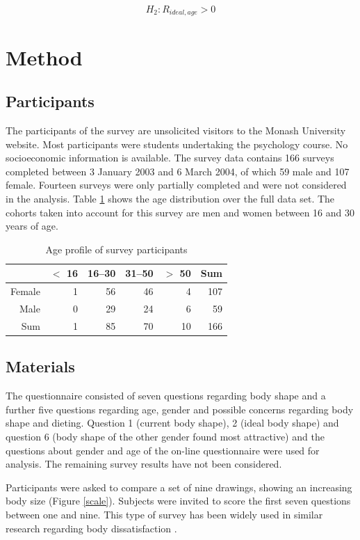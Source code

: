 \documentclass[a4paper, apacite, jou, 11pt]{apa6}
\begin{document}
$$H_2: R_{ideal,age} >0$$
\section{Method}
\label{sec:org6caee07}
\subsection{Participants}
\label{sec:org3a32bf9}
The participants of the survey are unsolicited visitors to the Monash University website. Most participants were students undertaking the psychology course. No socioeconomic information is available. The survey data contains 166 surveys completed between 3 January 2003 and 6 March 2004, of which 59 male and 107 female. Fourteen surveys were only partially completed and were not considered in the analysis. Table \ref{gender-age} shows the age distribution over the full data set. The cohorts taken into account for this survey are men and women between 16 and 30 years of age. 

\begin{table}[ht]
\centering
\begin{tabular}{rrrrrr}
  \hline
 & $<$ 16 & 16--30 & 31--50 & $>$ 50 & Sum \\ 
  \hline
Female & 1 & 56 & 46 & 4 & 107 \\ 
  Male & 0 & 29 & 24 & 6 & 59 \\ 
  Sum & 1 & 85 & 70 & 10 & 166 \\ 
   \hline
\end{tabular}
\caption{Age profile of survey participants} 
\label{gender-age}
\end{table}

\subsection{Materials}
\label{sec:orgcea798c}
The questionnaire consisted of seven questions regarding body shape and a further five questions regarding age, gender and possible concerns regarding body shape and dieting. Question 1 (current body shape), 2 (ideal body shape) and question 6 (body shape of the other gender found most attractive) and the questions about gender and age of the on-line questionnaire were used for analysis. The remaining survey results have not been considered.

Participants were asked to compare a set of nine drawings, showing an increasing body size (Figure \ref{scale}). Subjects were invited to score the first seven questions between one and nine. This type of survey has been widely used in similar research regarding body dissatisfaction \cite{abel_relationship_1996,byrne_should_1996,fallon_sex_1985,fear_prevalence_1996,hill_eating_1992,lamb_body_1993,tiggeman_development_1990,tiggeman_body-size_1992}. 
\end{document}
